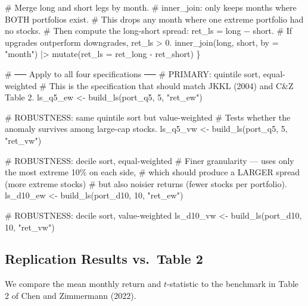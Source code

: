 \documentclass[
  letterpaper,
  DIV=11,
  numbers=noendperiod]{scrartcl}
\newenvironment{Shaded}{\begin{snugshade}}{\end{snugshade}}
\newcommand{\AttributeTok}[1]{\textcolor[rgb]{0.40,0.45,0.13}{#1}}
\newcommand{\CommentTok}[1]{\textcolor[rgb]{0.37,0.37,0.37}{#1}}
\newcommand{\DecValTok}[1]{\textcolor[rgb]{0.68,0.00,0.00}{#1}}
\newcommand{\FunctionTok}[1]{\textcolor[rgb]{0.28,0.35,0.67}{#1}}
\newcommand{\NormalTok}[1]{\textcolor[rgb]{0.00,0.23,0.31}{#1}}
\newcommand{\OtherTok}[1]{\textcolor[rgb]{0.00,0.23,0.31}{#1}}
\newcommand{\SpecialCharTok}[1]{\textcolor[rgb]{0.37,0.37,0.37}{#1}}
\newcommand{\StringTok}[1]{\textcolor[rgb]{0.13,0.47,0.30}{#1}}
\begin{document}
\begin{Shaded}
\begin{Highlighting}[]
  \CommentTok{\# Merge long and short legs by month.}
  \CommentTok{\# inner\_join: only keeps months where BOTH portfolios exist.}
  \CommentTok{\# This drops any month where one extreme portfolio had no stocks.}
  \CommentTok{\# Then compute the long{-}short spread: ret\_ls = long − short.}
  \CommentTok{\# If upgrades outperform downgrades, ret\_ls \textgreater{} 0.}
  \FunctionTok{inner\_join}\NormalTok{(long, short, }\AttributeTok{by =} \StringTok{"month"}\NormalTok{) }\SpecialCharTok{|\textgreater{}}
    \FunctionTok{mutate}\NormalTok{(}\AttributeTok{ret\_ls =}\NormalTok{ ret\_long }\SpecialCharTok{{-}}\NormalTok{ ret\_short)}
\NormalTok{\}}

\CommentTok{\# ── Apply to all four specifications ──}
\CommentTok{\# PRIMARY: quintile sort, equal{-}weighted}
\CommentTok{\# This is the specification that should match JKKL (2004) and C\&Z Table 2.}
\NormalTok{ls\_q5\_ew  }\OtherTok{\textless{}{-}} \FunctionTok{build\_ls}\NormalTok{(port\_q5, }\DecValTok{5}\NormalTok{, }\StringTok{"ret\_ew"}\NormalTok{)}

\CommentTok{\# ROBUSTNESS: same quintile sort but value{-}weighted}
\CommentTok{\# Tests whether the anomaly survives among large{-}cap stocks.}
\NormalTok{ls\_q5\_vw  }\OtherTok{\textless{}{-}} \FunctionTok{build\_ls}\NormalTok{(port\_q5, }\DecValTok{5}\NormalTok{, }\StringTok{"ret\_vw"}\NormalTok{)}

\CommentTok{\# ROBUSTNESS: decile sort, equal{-}weighted}
\CommentTok{\# Finer granularity — uses only the most extreme 10\% on each side,}
\CommentTok{\# which should produce a LARGER spread (more extreme stocks)}
\CommentTok{\# but also noisier returns (fewer stocks per portfolio).}
\NormalTok{ls\_d10\_ew }\OtherTok{\textless{}{-}} \FunctionTok{build\_ls}\NormalTok{(port\_d10, }\DecValTok{10}\NormalTok{, }\StringTok{"ret\_ew"}\NormalTok{)}

\CommentTok{\# ROBUSTNESS: decile sort, value{-}weighted}
\NormalTok{ls\_d10\_vw }\OtherTok{\textless{}{-}} \FunctionTok{build\_ls}\NormalTok{(port\_d10, }\DecValTok{10}\NormalTok{, }\StringTok{"ret\_vw"}\NormalTok{)}
\end{Highlighting}
\end{Shaded}

\subsection{Replication Results vs.~Table
2}\label{replication-results-vs.-table-2}

We compare the mean monthly return and \(t\)-statistic to the benchmark
in Table 2 of Chen and Zimmermann (2022).
\end{document}
